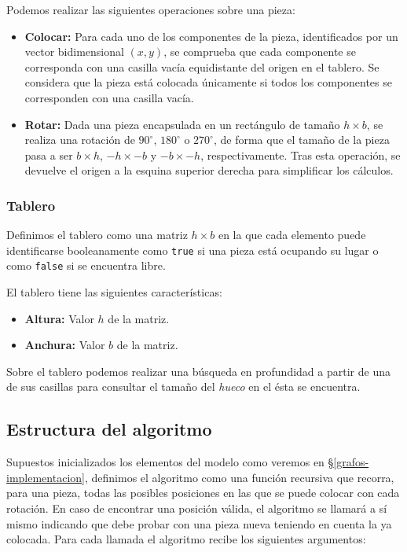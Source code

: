 Podemos realizar las siguientes operaciones sobre una pieza:

\begin{itemize}
	\item\textbf{Colocar:} Para cada uno de los componentes de la pieza, identificados por un vector bidimensional $(x,y)$, se comprueba que cada componente se corresponda con una casilla vacía equidistante del origen en el tablero. Se considera que la pieza está colocada únicamente si todos los componentes se corresponden con una casilla vacía.
	\item\textbf{Rotar:} Dada una pieza encapsulada en un rectángulo de tamaño $h\times b$, se realiza una rotación de $90^{\circ}$, $180^{\circ}$ o $270^{\circ}$, de forma que el tamaño de la pieza pasa a ser $b\times h$, $-h\times-b$ y $-b\times-h$, respectivamente. Tras esta operación, se devuelve el origen a la esquina superior derecha para simplificar los cálculos.
\end{itemize}

\subsubsection{Tablero}\label{grafos-algoritmo-definiciones-tablero}

Definimos el tablero como una matriz $h\times b$ en la que cada elemento puede identificarse booleanamente como \texttt{true} si una pieza está ocupando su lugar o como \texttt{false} si se encuentra libre.

El tablero tiene las siguientes características:

\begin{itemize}
	\item\textbf{Altura:} Valor $h$ de la matriz.
	\item\textbf{Anchura:} Valor $b$ de la matriz.
\end{itemize}

Sobre el tablero podemos realizar una búsqueda en profundidad a partir de una de sus casillas para consultar el tamaño del \textit{hueco} en el ésta se encuentra.

\subsection{Estructura del algoritmo}\label{grafos-algoritmo-estructura}

Supuestos inicializados los elementos del modelo como veremos en \S\ref{grafos-implementacion}, definimos el algoritmo como una función recursiva que recorra, para una pieza, todas las posibles posiciones en las que se puede colocar con cada rotación.
En caso de encontrar una posición válida, el algoritmo se llamará a sí mismo indicando que debe probar con una pieza nueva teniendo en cuenta la ya colocada.
Para cada llamada el algoritmo recibe los siguientes argumentos:

